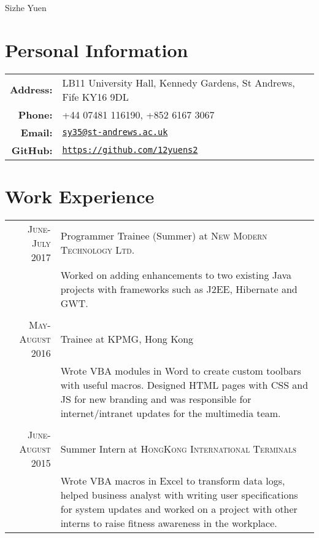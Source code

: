 \documentclass{article}
\begin{document}
\pagestyle{empty} %


\par{\centering
		{\Huge Sizhe Yuen
	}\bigskip\par}

\section*{Personal Information}

\begin{tabular}{rl}
    \textbf{Address:}   & LB11 University Hall, Kennedy Gardens, St Andrews, Fife KY16 9DL\\
    \textbf{Phone:}     & +44 07481 116190, +852 6167 3067 \\
    \textbf{Email:}     & \texttt{\href{mailto:sy35@st-andrews.ac.uk}{sy35@st-andrews.ac.uk}} \\
    \textbf{GitHub:}    & \texttt{\href{https://github.com/12yuens2}{https://github.com/12yuens2}}
\end{tabular}

\section*{Work Experience}
\begin{tabular}{r|p{15cm}}


\textsc{June-July 2017} & Programmer Trainee (Summer) at \textsc{New Modern Technology Ltd.} \\

&\footnotesize{Worked on adding enhancements to two existing Java projects with frameworks such as J2EE, Hibernate and GWT.}\\
\multicolumn{2}{c}{} \\


\textsc{May-August 2016} & Trainee at \textsc{KPMG}, Hong Kong \\
 
&\footnotesize{Wrote VBA modules in Word to create custom toolbars with useful macros. Designed HTML pages with CSS and JS for new branding and was responsible for internet/intranet updates for the multimedia team.}\\\multicolumn{2}{c}{} \\


\textsc{June-August 2015} & Summer Intern at \textsc{HongKong International Terminals} \\

&\footnotesize{Wrote VBA macros in Excel to transform data logs, helped business analyst with writing user specifications for system updates and worked on a project with other interns to raise fitness awareness in the workplace.}\\

\end{tabular}
\end{document}
